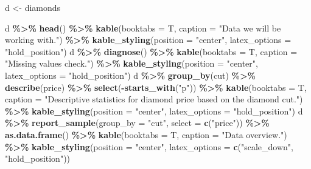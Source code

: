 \documentclass[
    numbers=noenddot,
    open=any,
    paper=a4,
    oneside,
    pagesize,
    captions=tableabove,
    bibliography=totoc,
    11pt
    ]{scrbook}
\newenvironment{Shaded}{\begin{snugshade}}{\end{snugshade}}
\newcommand{\DataTypeTok}[1]{\textcolor[rgb]{0.13,0.29,0.53}{#1}}
\newcommand{\KeywordTok}[1]{\textcolor[rgb]{0.13,0.29,0.53}{\textbf{#1}}}
\newcommand{\NormalTok}[1]{#1}
\newcommand{\OperatorTok}[1]{\textcolor[rgb]{0.81,0.36,0.00}{\textbf{#1}}}
\newcommand{\StringTok}[1]{\textcolor[rgb]{0.31,0.60,0.02}{#1}}
\begin{document}
\begin{Shaded}
\begin{Highlighting}[]
\NormalTok{d \textless{}{-}}\StringTok{ }\NormalTok{diamonds}

\NormalTok{d }\OperatorTok{\%\textgreater{}\%}
\StringTok{  }\KeywordTok{head}\NormalTok{() }\OperatorTok{\%\textgreater{}\%}
\StringTok{  }\KeywordTok{kable}\NormalTok{(}\DataTypeTok{booktabs =}\NormalTok{ T, }\DataTypeTok{caption =} \StringTok{"Data we will be working with."}\NormalTok{) }\OperatorTok{\%\textgreater{}\%}
\StringTok{  }\KeywordTok{kable\_styling}\NormalTok{(}\DataTypeTok{position =} \StringTok{"center"}\NormalTok{, }\DataTypeTok{latex\_options =} \StringTok{"hold\_position"}\NormalTok{)}
\NormalTok{d }\OperatorTok{\%\textgreater{}\%}
\StringTok{  }\KeywordTok{diagnose}\NormalTok{() }\OperatorTok{\%\textgreater{}\%}
\StringTok{  }\KeywordTok{kable}\NormalTok{(}\DataTypeTok{booktabs =}\NormalTok{ T, }\DataTypeTok{caption =} \StringTok{"Missing values check."}\NormalTok{) }\OperatorTok{\%\textgreater{}\%}
\StringTok{  }\KeywordTok{kable\_styling}\NormalTok{(}\DataTypeTok{position =} \StringTok{"center"}\NormalTok{, }\DataTypeTok{latex\_options =} \StringTok{"hold\_position"}\NormalTok{)}
\NormalTok{d }\OperatorTok{\%\textgreater{}\%}
\StringTok{  }\KeywordTok{group\_by}\NormalTok{(cut) }\OperatorTok{\%\textgreater{}\%}
\StringTok{  }\KeywordTok{describe}\NormalTok{(price) }\OperatorTok{\%\textgreater{}\%}
\StringTok{  }\KeywordTok{select}\NormalTok{(}\OperatorTok{{-}}\KeywordTok{starts\_with}\NormalTok{(}\StringTok{"p"}\NormalTok{)) }\OperatorTok{\%\textgreater{}\%}
\StringTok{  }\KeywordTok{kable}\NormalTok{(}\DataTypeTok{booktabs =}\NormalTok{ T, }\DataTypeTok{caption =} \StringTok{"Descriptive statistics for diamond price based on the diamond cut."}\NormalTok{) }\OperatorTok{\%\textgreater{}\%}
\StringTok{  }\KeywordTok{kable\_styling}\NormalTok{(}\DataTypeTok{position =} \StringTok{"center"}\NormalTok{, }\DataTypeTok{latex\_options =} \StringTok{"hold\_position"}\NormalTok{)}
\NormalTok{d }\OperatorTok{\%\textgreater{}\%}
\StringTok{  }\KeywordTok{report\_sample}\NormalTok{(}\DataTypeTok{group\_by =} \StringTok{"cut"}\NormalTok{, }\DataTypeTok{select =} \KeywordTok{c}\NormalTok{(}\StringTok{"price"}\NormalTok{)) }\OperatorTok{\%\textgreater{}\%}
\StringTok{  }\KeywordTok{as.data.frame}\NormalTok{() }\OperatorTok{\%\textgreater{}\%}
\StringTok{  }\KeywordTok{kable}\NormalTok{(}\DataTypeTok{booktabs =}\NormalTok{ T, }\DataTypeTok{caption =} \StringTok{"Data overview."}\NormalTok{) }\OperatorTok{\%\textgreater{}\%}
\StringTok{  }\KeywordTok{kable\_styling}\NormalTok{(}\DataTypeTok{position =} \StringTok{"center"}\NormalTok{, }\DataTypeTok{latex\_options =} \KeywordTok{c}\NormalTok{(}\StringTok{"scale\_down"}\NormalTok{, }\StringTok{"hold\_position"}\NormalTok{))}

\end{Highlighting}
\end{Shaded}
\end{document}
